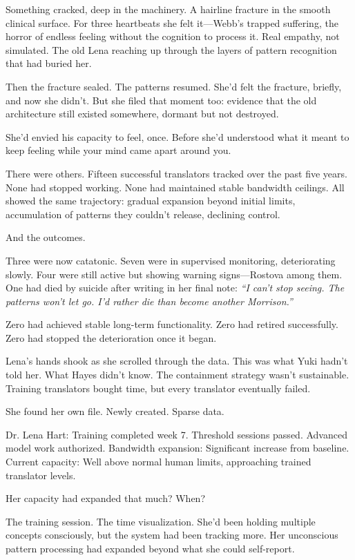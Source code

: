 Something cracked, deep in the machinery. A hairline fracture in the smooth clinical surface. For three heartbeats she felt it—Webb's trapped suffering, the horror of endless feeling without the cognition to process it. Real empathy, not simulated. The old Lena reaching up through the layers of pattern recognition that had buried her.

Then the fracture sealed. The patterns resumed. She'd felt the fracture, briefly, and now she didn't. But she filed that moment too: evidence that the old architecture still existed somewhere, dormant but not destroyed.

She'd envied his capacity to feel, once. Before she'd understood what it meant to keep feeling while your mind came apart around you.

There were others. Fifteen successful translators tracked over the past five years. None had stopped working. None had maintained stable bandwidth ceilings. All showed the same trajectory: gradual expansion beyond initial limits, accumulation of patterns they couldn't release, declining control.

And the outcomes.

Three were now catatonic. Seven were in supervised monitoring, deteriorating slowly. Four were still active but showing warning signs—Rostova among them. One had died by suicide after writing in her final note: \textit{``I can't stop seeing. The patterns won't let go. I'd rather die than become another Morrison.''}

Zero had achieved stable long-term functionality. Zero had retired successfully. Zero had stopped the deterioration once it began.

Lena's hands shook as she scrolled through the data. This was what Yuki hadn't told her. What Hayes didn't know. The containment strategy wasn't sustainable. Training translators bought time, but every translator eventually failed.

She found her own file. Newly created. Sparse data.

Dr. Lena Hart: Training completed week 7. Threshold sessions passed. Advanced model work authorized. Bandwidth expansion: Significant increase from baseline. Current capacity: Well above normal human limits, approaching trained translator levels.

Her capacity had expanded that much? When?

The training session. The time visualization. She'd been holding multiple concepts consciously, but the system had been tracking more. Her unconscious pattern processing had expanded beyond what she could self-report.


